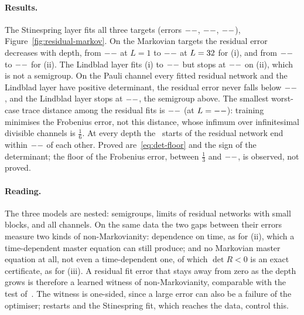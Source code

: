 \paragraph{Results.} The Stinespring layer fits all three targets (errors $--$, $--$,
$--$), Figure~\ref{fig:residual-markov}. On the Markovian targets the residual error decreases with
depth, from $--$ at $L=1$ to $--$ at $L=32$ for (i), and from $--$ to
$--$ for (ii). The Lindblad layer fits (i) to $--$ but stops at $--$ on
(ii), which is not a semigroup. On the Pauli channel every fitted residual network and the Lindblad layer have
positive determinant, the residual error never falls below $--$, and the Lindblad layer stops at
$--$, the semigroup above. The smallest worst-case trace distance among the residual fits is
$--$ (at $L=--$): training minimises the Frobenius error, not this distance, whose
infimum over infinitesimal divisible channels is $\tfrac16$. At every depth the \RMRestarts\ starts of the residual
network end within $--$ of each other. Proved are~\eqref{eq:det-floor} and the sign of the determinant; the
floor of the Frobenius error, between $\tfrac13$ and $--$, is observed, not proved.

\paragraph{Reading.} The three models are nested: semigroups, limits of residual networks with small blocks, and all
channels. On the same data the two gaps between their errors measure two kinds of non-Markovianity: dependence on
time, as for (ii), which a time-dependent master equation can still produce; and no Markovian master equation at all,
not even a time-dependent one, of which $\det R<0$ is an exact certificate, as for (iii). A residual fit error that stays away from zero as the depth grows is
therefore a learned witness of non-Markovianity, comparable with the test of~\cite{wolf2008}. The witness is
one-sided, since a large error can also be a failure of the optimiser; restarts and the Stinespring fit, which
reaches the data, control this.
